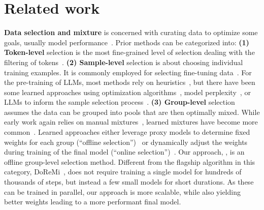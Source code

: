 \section{Related work}

\textbf{Data selection and mixture} is concerned with curating data to optimize some goals, usually model performance~\citep{koh2017understanding,albalak2024survey}. Prior methods can be categorized into: \textbf{(1) Token-level} selection is the most fine-grained level of selection dealing with the filtering of tokens~\cite{lin2024rho1}.
\textbf{(2) Sample-level} selection is about choosing individual training examples. It is commonly employed for selecting fine-tuning data~\citep{thakkar2023self, das2023deft,xie2023data,engstrom2024dsdm,xia2024less, liu2023makes, bukharin2023data,kang2024get,mekala2024smaller, sachin2024selectllm,yang2024smalltolarge}. For the pre-training of LLMs, most methods rely on heuristics~\citep{rae2023gopher,sharma2024text,soldaini2024dolma}, but there have been some learned approaches using optimization algorithms~\citep{chen2024take,mindermann2022prioritized,shao2024balanced,yu2024mates}, model perplexity~\citep{marion2023investigating,muennighoff2023scaling}, or LLMs to inform the sample selection process~\citep{alex2024qurating,sachdeva2024train,zhang2024autonomous}. \textbf{(3) Group-level} selection assumes the data can be grouped into pools that are then optimally mixed. While early work again relies on manual mixtures~\citep{the_pile_corpus,gpt3paper}, learned mixtures have become more common~\citep{albalak2024survey}. Learned approaches either leverage proxy models to determine fixed weights for each group (``offline selection'')~\citep{rae2023gopher,xie2023doremi,fan2023doge} or dynamically adjust the weights during training of the final model (``online selection'')~\citep{chen2023skill}. Our approach, \ourmethod, is an offline group-level selection method. Different from the flagship algorithm in this category, DoReMi~\citep{xie2023doremi}, \ourmethod does not require training a single model for hundreds of thousands of steps, but instead a few small models for short durations. As these can be trained in parallel, our approach is more scalable, while also yielding better weights leading to a more performant final model.

